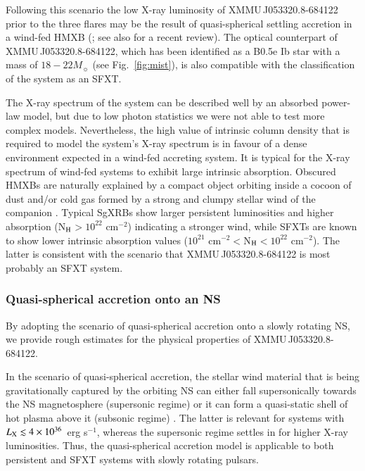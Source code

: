 \documentclass[a4paper,fleqn,usenatbib]{mnras}
\newcommand{\ohcm}[1]{$10^{#1}$ cm$^{-2}$}
\newcommand{\nh}{N$_{\rm H}$}
\newcommand{\candb}{XMMU\,J053320.8-684122\xspace} %
\begin{document}
Following this scenario the low X-ray luminosity of \candb prior to the three flares may be the result of quasi-spherical settling accretion in a wind-fed HMXB (\citealt{2012MNRAS.420..216S}; see also \citealt{2017arXiv170203393S} for a recent review). 
The optical counterpart of \candb, which has been identified as a B0.5e Ib star with a mass of $18-22 M_{\sun}$ (see Fig.~\ref{fig:mist}), is also compatible with the classification of the system as an SFXT.

The X-ray spectrum of the system can be described well by an absorbed power-law model, but due to low photon statistics we were not able to test more complex models. Nevertheless, the high value of intrinsic column density that is required to model the system's X-ray spectrum is in favour of a dense environment expected in a wind-fed accreting system. 
It is typical for the X-ray spectrum of wind-fed systems to exhibit large intrinsic absorption.
Obscured HMXBs are naturally explained by a compact object orbiting inside a cocoon of dust and/or cold gas formed by a strong and clumpy stellar wind of the companion \citep{2008ChJAS...8..197C,2008arXiv0809.1076C,2012MmSAI..83..251B}.
Typical SgXRBs show larger persistent luminosities and higher absorption (\nh$>$\ohcm{22}) indicating a stronger wind, while SFXTs are known to show lower intrinsic absorption values (\ohcm{21}$<$\nh$<$\ohcm{22}). The latter is consistent with the scenario that \candb is most probably an SFXT system.

\subsubsection{Quasi-spherical accretion onto an NS}
By adopting the scenario of quasi-spherical accretion onto a slowly rotating NS, we provide rough estimates for the physical properties of \candb.

In the scenario of quasi-spherical accretion, the stellar wind material that is being gravitationally captured by the orbiting NS can either fall supersonically towards the NS magnetosphere (supersonic regime) or it can form a quasi-static shell of hot plasma above it (subsonic regime) \citep{2012MNRAS.420..216S}.  The latter is relevant for systems with $L_{\rm X}\lesssim 4\times 10^{36}$~erg s$^{-1}$, whereas the supersonic regime settles in for higher X-ray luminosities. Thus, the quasi-spherical accretion model is applicable to both persistent and SFXT systems with slowly rotating pulsars.
\end{document}
